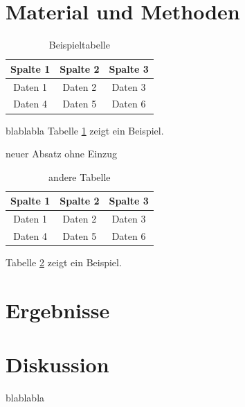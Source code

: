 \documentclass[a4paper,12pt,twoside]{article}
\begin{document}
	
	\newpage
	\section{Material und Methoden}
	\begin{table}[ht]
		\raggedright
		\caption{Beispieltabelle}
		\begin{tabular}{|c|c|c|}
			\hline
			Spalte 1 & Spalte 2 & Spalte 3 \\ \hline
			Daten 1  & Daten 2  & Daten 3  \\ \hline
			Daten 4  & Daten 5  & Daten 6  \\ \hline
		\end{tabular}
		\label{tab:beispiel}
	\end{table} 
	\noindent %
	blablabla Tabelle \ref{tab:beispiel} zeigt ein Beispiel.
	\\%
	\par\noindent neuer Absatz ohne Einzug
	\begin{table}[ht]
		\centering
		\begin{tabular}{|c|c|c|}
			\hline
			Spalte 1 & Spalte 2 & Spalte 3 \\ \hline
			Daten 1  & Daten 2  & Daten 3  \\ \hline
			Daten 4  & Daten 5  & Daten 6  \\ \hline
		\end{tabular}
		\caption{andere Tabelle}
		\label{tab:andere}
	\end{table}
	\par\noindent  Tabelle \ref{tab:andere} zeigt ein Beispiel.
	
	\newpage
	\section{Ergebnisse}
	
	\newpage
	\section{Diskussion}
	blablabla
	
	
	\newpage
	\pagestyle{plain} %
	\printbibliography
	
	
	\newpage
	\pagestyle{plain} %
	\listoffigures
	
\end{document}
